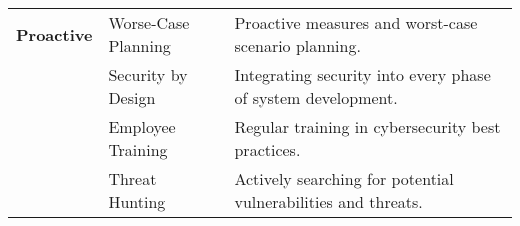 \begin{longtable}{|>{\raggedright}m{2.5cm}|>{\raggedright}m{3.5cm}|>{\raggedright\arraybackslash}m{8cm}|}
    \textbf{Proactive} & Worse-Case Planning & Proactive measures and worst-case scenario planning. \\
    \cline{2-3}
    & Security by Design & Integrating security into every phase of system development. \\
    \cline{2-3}
    & Employee Training & Regular training in cybersecurity best practices. \\
    \cline{2-3}
    & Threat Hunting & Actively searching for potential vulnerabilities and threats. \\
    \hline
\end{longtable}